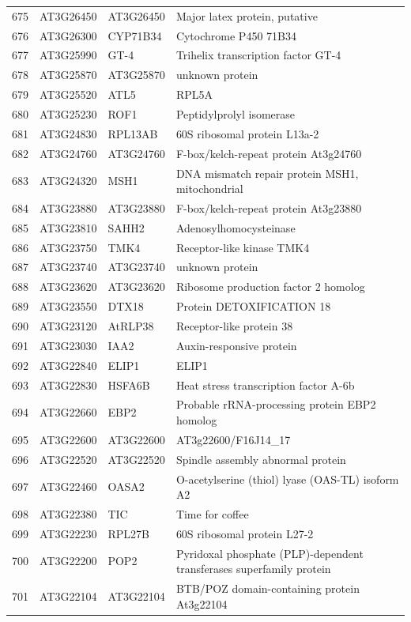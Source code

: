 \documentclass[11pt]{article}
\begin{document}
\begin{center}
\begin{tabular}{rlll}
675 & AT3G26450 & AT3G26450 & Major latex protein, putative\\
676 & AT3G26300 & CYP71B34 & Cytochrome P450 71B34\\
677 & AT3G25990 & GT-4 & Trihelix transcription factor GT-4\\
678 & AT3G25870 & AT3G25870 & unknown protein\\
679 & AT3G25520 & ATL5 & RPL5A\\
680 & AT3G25230 & ROF1 & Peptidylprolyl isomerase\\
681 & AT3G24830 & RPL13AB & 60S ribosomal protein L13a-2\\
682 & AT3G24760 & AT3G24760 & F-box/kelch-repeat protein At3g24760\\
683 & AT3G24320 & MSH1 & DNA mismatch repair protein MSH1, mitochondrial\\
684 & AT3G23880 & AT3G23880 & F-box/kelch-repeat protein At3g23880\\
685 & AT3G23810 & SAHH2 & Adenosylhomocysteinase\\
686 & AT3G23750 & TMK4 & Receptor-like kinase TMK4\\
687 & AT3G23740 & AT3G23740 & unknown protein\\
688 & AT3G23620 & AT3G23620 & Ribosome production factor 2 homolog\\
689 & AT3G23550 & DTX18 & Protein DETOXIFICATION 18\\
690 & AT3G23120 & AtRLP38 & Receptor-like protein 38\\
691 & AT3G23030 & IAA2 & Auxin-responsive protein\\
692 & AT3G22840 & ELIP1 & ELIP1\\
693 & AT3G22830 & HSFA6B & Heat stress transcription factor A-6b\\
694 & AT3G22660 & EBP2 & Probable rRNA-processing protein EBP2 homolog\\
695 & AT3G22600 & AT3G22600 & AT3g22600/F16J14\_17\\
696 & AT3G22520 & AT3G22520 & Spindle assembly abnormal protein\\
697 & AT3G22460 & OASA2 & O-acetylserine (thiol) lyase (OAS-TL) isoform A2\\
698 & AT3G22380 & TIC & Time for coffee\\
699 & AT3G22230 & RPL27B & 60S ribosomal protein L27-2\\
700 & AT3G22200 & POP2 & Pyridoxal phosphate (PLP)-dependent transferases superfamily protein\\
701 & AT3G22104 & AT3G22104 & BTB/POZ domain-containing protein At3g22104\\

\end{tabular}
\end{center}
\end{document}
